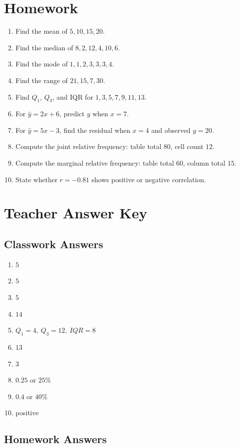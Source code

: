 \documentclass[11pt]{book}
\begin{document}
\section{Homework}

\begin{enumerate}
\item Find the mean of \(5,10,15,20\).
\item Find the median of \(8,2,12,4,10,6\).
\item Find the mode of \(1,1,2,3,3,3,4\).
\item Find the range of \(21,15,7,30\).
\item Find \(Q_1\), \(Q_3\), and IQR for \(1,3,5,7,9,11,13\).
\item For \(\hat y=2x+6\), predict \(y\) when \(x=7\).
\item For \(\hat y=5x-3\), find the residual when \(x=4\) and observed \(y=20\).
\item Compute the joint relative frequency: table total \(80\), cell count \(12\).
\item Compute the marginal relative frequency: table total \(60\), column total \(15\).
\item State whether \(r=-0.81\) shows positive or negative correlation.
\end{enumerate}

\section{Teacher Answer Key}

\subsection{Classwork Answers}

\begin{enumerate}
\item \(5\)
\item \(5\)
\item \(5\)
\item \(14\)
\item \(Q_1=4,\ Q_3=12,\ IQR=8\)
\item \(13\)
\item \(3\)
\item \(0.25\) or \(25\%\)
\item \(0.4\) or \(40\%\)
\item positive
\end{enumerate}

\subsection{Homework Answers}
\end{document}
